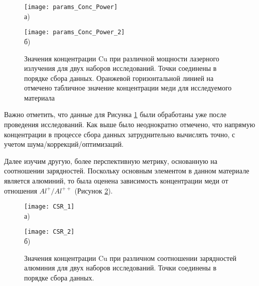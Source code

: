\begin{figure}[htb]
	\begin{minipage}[b]{0.49\textwidth}\centering
		\texttt{[image: params\_Conc\_Power]} \\ а)
	\end{minipage}
	\begin{minipage}[b]{0.49\textwidth}\centering
		\texttt{[image: params\_Conc\_Power\_2]} \\ б)
	\end{minipage}
	\caption{Значения концентрации Cu при различной мощности лазерного излучения для двух наборов исследований. Точки соединены в порядке сбора данных. Оранжевой горизонтальной линией на отмечено табличное значение концентрации меди для исследуемого материала}
	\label{fig:params_Conc_Power}
\end{figure}

\FloatBarrier

Важно отметить, что данные для Рисунка \cref{fig:params_Conc_Power} были обработаны уже после проведения исследований. Как выше было неоднократно отмечено, что напрямую концентрации в процессе сбора данных затруднительно вычислять точно, с учетом шума/коррекций/оптимизаций.

Далее изучим другую, более перспективную метрику, основанную на соотношении зарядностей. Поскольку основным элементом в данном материале является алюминий, то была оценена зависимость концентрации меди от отношения $Al^{+}/Al^{++}$ (Рисунок \cref{fig:params_Conc_CSR}).

\begin{figure}[htb]
	\begin{minipage}[b]{0.49\textwidth}\centering
		\texttt{[image: CSR\_1]} \\ а)
	\end{minipage}
	\begin{minipage}[b]{0.49\textwidth}\centering
		\texttt{[image: CSR\_2]} \\ б)
	\end{minipage}
	\caption{Значения концентрации Cu при различном соотношении зарядностей алюминия для двух наборов исследований. Точки соединены в порядке сбора данных.}
	\label{fig:params_Conc_CSR}
\end{figure}

